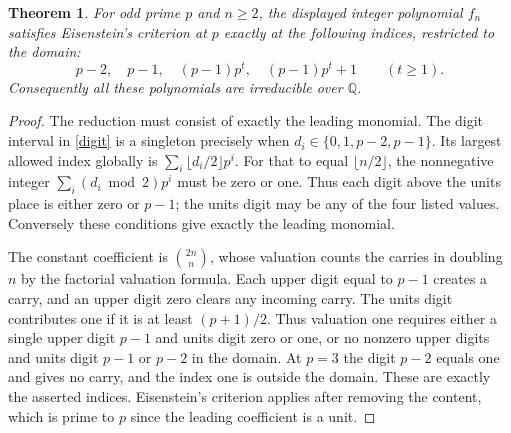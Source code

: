 \documentclass[11pt]{article}
\newtheorem{theorem}{Theorem}\newtheorem{lemma}[theorem]{Lemma}
\begin{document}
\begin{theorem}\label{unshifted}
For odd prime $p$ and $n\ge2$, the displayed integer polynomial $f_n$ satisfies Eisenstein's criterion at $p$ exactly at the following indices, restricted to the domain:
\[
 p-2,\quad p-1,\quad (p-1)p^t,\quad (p-1)p^t+1\qquad(t\ge1).
\]
Consequently all these polynomials are irreducible over $\mathbb Q$.
\end{theorem}
\begin{proof}
The reduction must consist of exactly the leading monomial. The digit interval in \eqref{digit} is a singleton precisely when $d_i\in\{0,1,p-2,p-1\}$. Its largest allowed index globally is $\sum_i\lfloor d_i/2\rfloor p^i$. For that to equal $\lfloor n/2\rfloor$, the nonnegative integer $\sum_i (d_i\bmod2)p^i$ must be zero or one. Thus each digit above the units place is either zero or $p-1$; the units digit may be any of the four listed values. Conversely these conditions give exactly the leading monomial.

The constant coefficient is $\binom{2n}{n}$, whose valuation counts the carries in doubling $n$ by the factorial valuation formula. Each upper digit equal to $p-1$ creates a carry, and an upper digit zero clears any incoming carry. The units digit contributes one if it is at least $(p+1)/2$. Thus valuation one requires either a single upper digit $p-1$ and units digit zero or one, or no nonzero upper digits and units digit $p-1$ or $p-2$ in the domain. At $p=3$ the digit $p-2$ equals one and gives no carry, and the index one is outside the domain. These are exactly the asserted indices. Eisenstein's criterion applies after removing the content, which is prime to $p$ since the leading coefficient is a unit.\end{proof}
\end{document}
